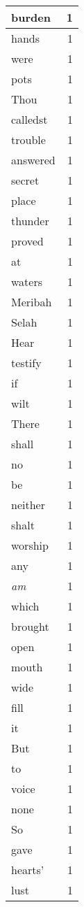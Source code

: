\begin{center}
\begin{longtable}{l|r}
burden & 1 \\ \hline
hands & 1 \\ \hline
were & 1 \\ \hline
pots & 1 \\ \hline
Thou & 1 \\ \hline
calledst & 1 \\ \hline
trouble & 1 \\ \hline
answered & 1 \\ \hline
secret & 1 \\ \hline
place & 1 \\ \hline
thunder & 1 \\ \hline
proved & 1 \\ \hline
at & 1 \\ \hline
waters & 1 \\ \hline
Meribah & 1 \\ \hline
Selah & 1 \\ \hline
Hear & 1 \\ \hline
testify & 1 \\ \hline
if & 1 \\ \hline
wilt & 1 \\ \hline
There & 1 \\ \hline
shall & 1 \\ \hline
no & 1 \\ \hline
be & 1 \\ \hline
neither & 1 \\ \hline
shalt & 1 \\ \hline
worship & 1 \\ \hline
any & 1 \\ \hline
\emph{am} & 1 \\ \hline
which & 1 \\ \hline
brought & 1 \\ \hline
open & 1 \\ \hline
mouth & 1 \\ \hline
wide & 1 \\ \hline
fill & 1 \\ \hline
it & 1 \\ \hline
But & 1 \\ \hline
to & 1 \\ \hline
voice & 1 \\ \hline
none & 1 \\ \hline
So & 1 \\ \hline
gave & 1 \\ \hline
hearts' & 1 \\ \hline
lust & 1 \\ \hline

\end{longtable}
\end{center}
